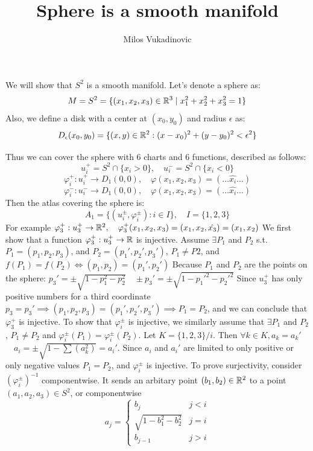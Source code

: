 \documentclass[11pt,a4paper]{report}
\author{Milos Vukadinovic}
\title{Sphere is a smooth manifold}
\begin{document}
We will show that $S^2$ is a smooth manifold. Let's denote a sphere as:
$$ M = S^2 = \{(x_1,x_2,x_3) \in \mathbb{R}^3 \mid x_1^2 + x_2^2 + x_3^2 = 1 \} $$
Also, we define a disk with a center at $(x_0,y_0)$ and radius $\epsilon$ as:
$$ D_{\epsilon}(x_0,y_0) = \{(x,y) \in \mathbb{R}^2 : (x-x_0)^2 + (y-y_0)^2 < \epsilon^2 \} $$

Thus we can cover the sphere with 6 charts and 6 functions, described as follows:
$$ u_i^{+} = S^2 \cap \{x_i > 0 \}, \quad u_i^{-} = S^2 \cap \{x_i < 0 \} $$
$$ \varphi_i^{+}: u_i^{+} \to D_{1}(0,0), \quad \varphi(x_1,x_2,x_3) = (\dots \hat{x_i} \dots)$$
$$ \varphi_i^{-}: u_i^{-} \to D_{1}(0,0), \quad \varphi(x_1,x_2,x_3) = (\dots \hat{x_i} \dots)$$
Then the atlas covering the sphere is:
$$ A_1 = \{(u_i^{\pm},\varphi_i^{\pm}) : i \in I \}, \quad I = \{ 1,2,3 \} $$
For example $\varphi_3^{+}: u_3^{+} \to \mathbb{R}^2, \quad \varphi_3^{+}(x_1,x_2,x_3) = (x_1,x_2,\hat{x_3}) =(x_1,x_2)$
\newline
\newline
We first show that a function $\varphi_3^{+}: u_3^{+} \to \mathbb{R}$ is injective. Assume $\exists P_1$ and $P_2$ s.t. $P_1 = (p_1,p_2,p_3)$,
and $P_2 = (p_1\prime,p_2\prime,p_3\prime)$, $P_1 \neq P2$, and $f(P_1) = f(P_2) \iff  (p_1,p_2) = (p_1\prime, p_2\prime)$
\newline
Because $P_1$ and $P_2$ are the points on the sphere:
$p_3\prime = \pm \sqrt{1-p_1^2-p_2^2} \quad \pm p_3\prime = \pm \sqrt{1-p_1\prime^2-p_2\prime^2}$
Since $u_3^{+}$ has only positive numbers for a third coordinate $p_3 = p_3\prime \implies (p_1,p_2,p_3) = (p_1\prime,p_2\prime,p_3\prime) \implies P_1=P_2$, and we can conclude that $\varphi_3^{+}$ is injective.
\newline
\newline
To show that $\varphi_i^{\pm}$ is injective, we similarly assume that $ \exists P_1$ and $P_2$, $P_1 \neq P_2$ and 
$\varphi_i^{\pm}(P_1) = \varphi_i^{\pm}(P_2)$. Let $K= \{1,2,3\}/i$. Then $\forall k \in K, a_k= a_k\prime$ 
$\quad a_i = \pm \sqrt{1-\sum(a_k^2)} = a_i\prime$. Since $a_i$ and $a_i\prime$ are limited to only positive or only negative values  $P_1 = P_2$, and $\varphi_i^{\pm}$ is injective.
\newline
\newline
To prove surjectivity, consider $(\varphi_i^{\pm})^{-1}$ componentwise. It sends an arbitary point $(b_1,b_2) \in \mathbb{R}^2$ to a point $(a_1,a_2,a_3) \in S^2$, or componentwise
\[
  a_j =
  \begin{cases}
                                   b_j & j<i \\
                                   \sqrt{1-b_1^2-b_2^2} & j=i \\
                                   b_{j-1} & j>i
  \end{cases}
\]
\end{document}
